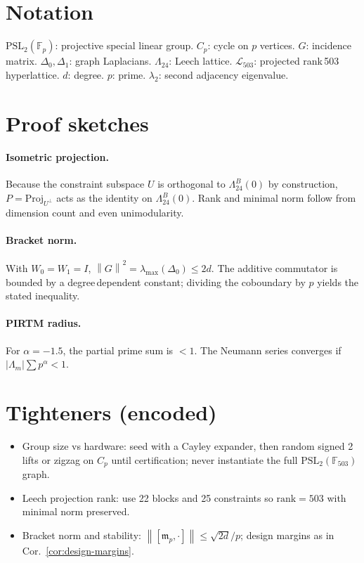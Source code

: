 \documentclass[11pt]{article}
\theoremstyle{definition}
\newcommand{\PSL}{\mathrm{PSL}}
\newcommand{\F}{\mathbb F}
\newcommand{\PSL}{\mathrm{PSL}}
\newcommand{\LLeech}{\Lambda_{24}}
\newcommand{\Lproj}{\mathcal L_{503}}
\newcommand{\norm}[1]{\left\lVert #1 \right\rVert}
\begin{document}
\appendix
\section{Notation}
$\PSL_2(\F_p)$: projective special linear group. $C_p$: cycle on $p$ vertices. $G$: incidence matrix. $\Delta_0,\Delta_1$: graph Laplacians. $\LLeech$: Leech lattice. $\Lproj$: projected rank\,503 hyperlattice. $d$: degree. $p$: prime. $\lambda_2$: second adjacency eigenvalue.

\section{Proof sketches}
\paragraph{Isometric projection.} Because the constraint subspace $U$ is orthogonal to $\LLeech^B(0)$ by construction, $P=\mathrm{Proj}_{U^{\perp}}$ acts as the identity on $\LLeech^B(0)$. Rank and minimal norm follow from dimension count and even unimodularity.

\paragraph{Bracket norm.} With $W_0=W_1=I$, $\norm{G}^2=\lambda_{\max}(\Delta_0)\le 2d$. The additive commutator is bounded by a degree\,dependent constant; dividing the coboundary by $p$ yields the stated inequality.

\paragraph{PIRTM radius.} For $\alpha=-1.5$, the partial prime sum is $<1$. The Neumann series converges if $|\Lambda_m|\sum p^{\alpha}<1$.

\section{Tighteners (encoded)}
\begin{itemize}
\item Group size vs hardware: seed with a Cayley expander, then random signed 2\,lifts or zig\textendash zag on $C_p$ until certification; never instantiate the full $\PSL_2(\F_{503})$ graph.
\item Leech projection rank: use 22 blocks and 25 constraints so $\mathrm{rank}=503$ with minimal norm preserved.
\item Bracket norm and stability: $\norm{[\mathfrak m_p,\cdot]}\le \sqrt{2d}/p$; design margins as in Cor.~\ref{cor:design-margins}.
\end{itemize}
\end{document}

